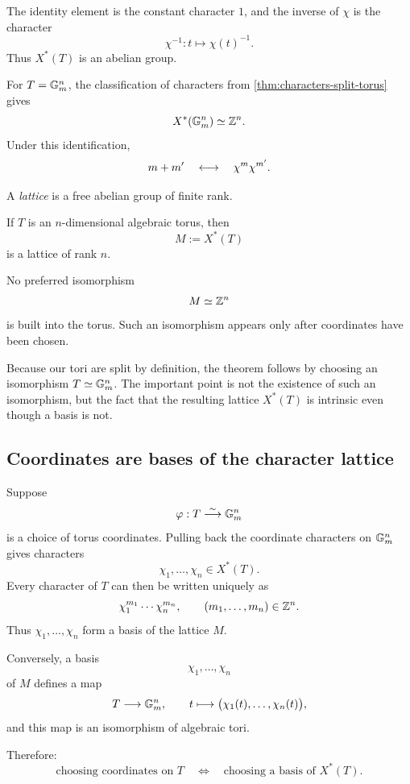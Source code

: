 The identity element is the constant character \(1\), and the inverse
of \(\chi\) is the character
\[
\chi^{-1}:t\longmapsto\chi(t)^{-1}.
\]
Thus \(X^*(T)\) is an abelian group.

For \(T=\mathbb{G}_{m}^n\), the classification of characters from
\cref{thm:characters-split-torus} gives
\[
X^*(\mathbb{G}_{m}^n)\simeq\mathbb{Z}^n.
\]
Under this identification,
\[
m+m'
\quad\longleftrightarrow\quad
\chi^{m}\chi^{m'}.
\]

\begin{definition}
A \emph{lattice} is a free abelian group of finite rank.
\end{definition}

\begin{theorem}
If \(T\) is an \(n\)-dimensional algebraic torus, then
\[
M:=X^*(T)
\]
is a lattice of rank \(n\).
\end{theorem}

No preferred isomorphism
\[
M\simeq\mathbb{Z}^n
\]
is built into the torus. Such an isomorphism appears only after
coordinates have been chosen.

\begin{observation}
Because our tori are split by definition, the theorem follows by
choosing an isomorphism \(T\simeq\mathbb{G}_{m}^n\). The important point is not
the existence of such an isomorphism, but the fact that the resulting
lattice \(X^*(T)\) is intrinsic even though a basis is not.
\end{observation}

\subsection{Coordinates are bases of the character lattice}

Suppose
\[
\varphi:T\overset{\sim}{\longrightarrow}\mathbb{G}_{m}^n
\]
is a choice of torus coordinates. Pulling back the coordinate
characters on \(\mathbb{G}_{m}^n\) gives characters
\[
\chi_1,\ldots,\chi_n\in X^*(T).
\]
Every character of \(T\) can then be written uniquely as
\[
\chi_1^{m_1}\cdots\chi_n^{m_n},
\qquad
(m_1,\ldots,m_n)\in\mathbb{Z}^n.
\]
Thus \(\chi_1,\ldots,\chi_n\) form a basis of the lattice \(M\).

Conversely, a basis
\[
\chi_1,\ldots,\chi_n
\]
of \(M\) defines a map
\[
T\longrightarrow\mathbb{G}_{m}^n,
\qquad
t\longmapsto
\bigl(\chi_1(t),\ldots,\chi_n(t)\bigr),
\]
and this map is an isomorphism of algebraic tori.

Therefore:
\[
\boxed{
\text{choosing coordinates on }T
\quad\Longleftrightarrow\quad
\text{choosing a basis of }X^*(T).
}
\]

